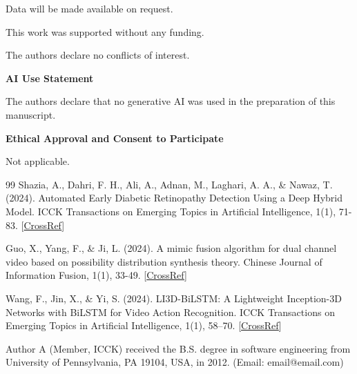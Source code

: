 \documentclass[twocolumn,proof]{ICCKjournal} %
\begin{document}
Data will be made available on request.

\acknowledgement
This work was supported without any funding.

\conflictsofinterest
The authors declare no conflicts of interest. 

\vspace{10pt}

{\large\textbf{AI Use Statement}} 

The authors declare that no generative AI was used in the preparation of this manuscript.

\vspace{10pt}

{\large\textbf{Ethical Approval and Consent to Participate}} 

Not applicable.

%

\begin{fullwidth}
\begin{thebibliography}{99}
 Shazia, A., Dahri, F. H., Ali, A., Adnan, M., Laghari, A. A., \& Nawaz, T. (2024). Automated Early Diabetic Retinopathy Detection Using a Deep Hybrid Model. ICCK Transactions on Emerging Topics in Artificial Intelligence, 1(1), 71-83. [\href{https://doi.org/10.62762/TETAI.2024.305743}{CrossRef}]

 Guo, X., Yang, F., \& Ji, L. (2024). A mimic fusion algorithm for dual channel video based on possibility distribution synthesis theory. Chinese Journal of Information Fusion, 1(1), 33-49. [\href{https://doi.org/10.62762/CJIF.2024.361886}{CrossRef}]

 Wang, F., Jin, X., \& Yi, S. (2024). LI3D-BiLSTM: A Lightweight Inception-3D Networks with BiLSTM for Video Action Recognition. ICCK Transactions on Emerging Topics in Artificial Intelligence, 1(1), 58–70. [\href{https://doi.org/10.62762/TETAI.2024.628205}{CrossRef}]

\end{thebibliography}
\end{fullwidth}

\makeatletter
\if@twocolumn

  \begin{biography}[author1]{Author A} (Member, ICCK) received the B.S. degree in software engineering from University of Pennsylvania, PA 19104, USA, in 2012. (Email: email@email.com)
  \end{biography}
\end{document}
